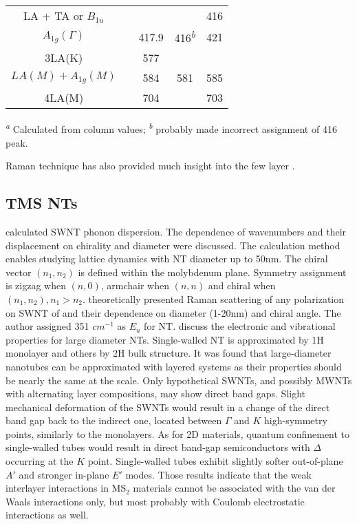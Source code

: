 \begin{table}
\begin{tabular}{ccccc}
     LA + TA \cite{Sourisseau1991} or $B_{1u}$\cite{Staiger2012}  &      &       &   &  416 \\
          $A_{1g}(\Gamma)$   &      & 417.9                        & 416\textsuperscript{\emph{b}} &  421\\
               3LA(K)        &      & 577                          &              &      \\
       $ LA(M)+ A_{1g}(M)$   &      & 584                          & 581          &  585 \\
    4LA(M)                   &      & 704                          &              &  703\\
    \bottomrule
  \end{tabular}

  \textsuperscript{\emph{a}} Calculated from column values;
  \textsuperscript{\emph{b}} \citeauthor{JMR7990865} probably made incorrect assignment of 416 peak.\cite{JMR7990865}
\end{table}

Raman technique has also provided much insight into the few layer .


\subsection{TMS NTs}\label{sec:ntram}

\citeauthor{Dobardzic2005} calculated  SWNT phonon dispersion. The dependence of wavenumbers and their displacement on chirality and diameter were discussed. The calculation method enables studying lattice dynamics with NT diameter up to 50nm. The chiral vector $(n_1, n_2)$ is defined within the molybdenum plane. Symmetry assignment is zigzag when $(n,0)$, armchair when $(n,n)$ and chiral when $(n_1, n_2), n_1>n_2$. \citeauthor{Dobardzic2006} theoretically presented Raman scattering of any polarization on SWNT of  and their dependence on diameter (1-20nm) and chiral angle. The author assigned 351 $cm^{-1}$ as $E_u$ for  NT.\cite{Dobardzic2006} \citeauthor{Ghorbani-asl} discuss the electronic and vibrational properties for large diameter  NTs\cite{Ghorbani-asl}. Single-walled NT is approximated by 1H monolayer and others by 2H bulk structure. It was found that large-diameter nanotubes can be approximated with layered systems as their properties should be nearly the same at the scale. Only hypothetical SWNTs, and possibly MWNTs with alternating layer compositions, may show direct band gaps. Slight mechanical deformation of the SWNTs would result in a change of the direct band gap back to the indirect one, located between $\Gamma$ and $K$ high-symmetry points, similarly to the monolayers. As for 2D materials, quantum confinement to single-walled tubes would result in direct band-gap semiconductors with $\Delta$ occurring at the $K$ point. Single-walled tubes exhibit slightly softer out-of-plane $A'$ and stronger in-plane $E'$ modes. Those results indicate that the weak interlayer interactions in MS$_2$ materials cannot be associated with the van der Waals interactions only, but most probably with Coulomb electrostatic interactions as well.

